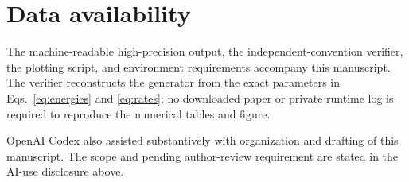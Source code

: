 \documentclass[aps,pre,reprint,superscriptaddress,nofootinbib]{revtex4-2}
\begin{document}
\section*{Data availability}

The machine-readable high-precision output, the independent-convention verifier,
the plotting script, and environment requirements accompany this manuscript.  The
verifier reconstructs the generator from the exact
parameters in Eqs.~\eqref{eq:energies} and \eqref{eq:rates}; no downloaded paper or
private runtime log is required to reproduce the numerical tables and figure.

\begin{acknowledgments}
OpenAI Codex also assisted substantively with organization and drafting of this
manuscript.  The scope and pending author-review requirement are stated in the
AI-use disclosure above.
\end{acknowledgments}


\end{document}
